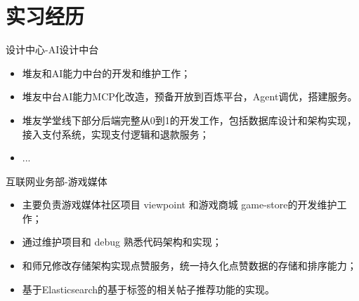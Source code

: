 \documentclass{resume}
\begin{document}
\section{实习经历}
\Content
{{设计中心-AI设计中台}}
{
    \begin{itemize}
        \item 堆友和AI能力中台的开发和维护工作；
        \item 堆友中台AI能力MCP化改造，预备开放到百炼平台，Agent调优，搭建服务。
        \item 堆友学堂线下部分后端完整从0到1的开发工作，包括数据库设计和架构实现，接入支付系统，实现支付逻辑和退款服务；
        \item ...
    \end{itemize}
}
\sepspace
{}
\Content
{{互联网业务部-游戏媒体}}
{
    \begin{itemize}
        \item 主要负责游戏媒体社区项目 viewpoint 和游戏商城 game-store的开发维护工作；
        \item 通过维护项目和 debug 熟悉代码架构和实现；
        \item 和师兄修改存储架构实现点赞服务，统一持久化点赞数据的存储和排序能力；
        \item 基于Elasticsearch的基于标签的相关帖子推荐功能的实现。
    \end{itemize}
}
\end{document}
